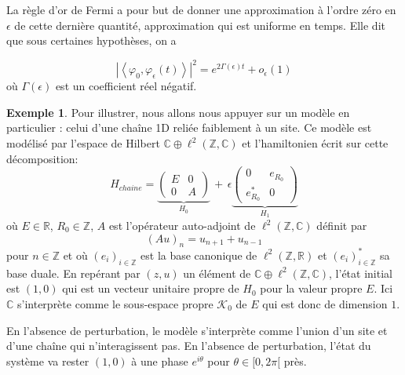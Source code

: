 \documentclass[12pt,openany,a4paper, titlepage]{article}
\newcommand{\lp}{\left(}
\newcommand{\rp}{\right)}
\newcommand{\la}{\left\langle}
\newcommand{\ra}{\right\rangle}
\newcommand{\R}{\mathbb{R}}
\newcommand{\C}{\mathbb{C}}
\newcommand{\Z}{\mathbb{Z}}
\newcommand{\vp}{\varphi}
\theoremstyle{definition}
\theoremstyle{definition}
\theoremstyle{definition}
\newtheorem{ex}{Exemple}
\theoremstyle{definition}
\theoremstyle{definition}
\theoremstyle{definition}
\begin{document}
La règle d'or de Fermi a pour but de donner une approximation à l'ordre zéro en $\epsilon$  de cette dernière quantité, approximation qui est uniforme en temps. Elle dit que sous certaines hypothèses, on a

\begin{equation}
    |\la \vp_0, \vp_\epsilon(t) \ra |^2 = e^{2\Gamma(\epsilon)t} + o_\epsilon(1)
\end{equation}
où $\Gamma(\epsilon)$ est un coefficient réel négatif. 


\begin{ex}
Pour illustrer, nous allons nous appuyer sur un modèle en particulier : celui d'une chaîne 1D reliée faiblement à un site. Ce modèle est modélisé par l'espace de Hilbert $\C\oplus\ell^2(\Z,\C)$ et l'hamiltonien écrit sur cette décomposition:
\begin{equation}
    H_{chaine} = \underbrace{\begin{pmatrix}
E & 0 \\
0 & A 
\end{pmatrix}}_{H_0} \,+\, \epsilon
\underbrace{\begin{pmatrix}
0        & e_{R_0} \\
e_{R_0}^* &  0
\end{pmatrix}}_{H_1}
\end{equation}
où $E\in\R$, $R_0\in\Z$, $A$ est l'opérateur auto-adjoint de $\ell^2(\Z,\C)$ définit par 
\begin{equation}
    (Au)_n = u_{n+1} + u_{n-1}
\end{equation}
pour $n\in\Z$ et où $\lp e_i\rp_{i\in\Z}$ est la base canonique de $\ell^2(\Z,\R)$ et $\lp e_i\rp_{i\in\Z}^*$ sa base duale. En repérant par $(z,u)$ un élément de $\C\oplus\ell^2(\Z,\C)$, l'état initial est $(1,0)$ qui est un vecteur unitaire propre de $H_0$ pour la valeur propre $E$. Ici $\C$ s'interprète comme le sous-espace propre $\mathcal{K}_0$ de $E$ qui est donc de dimension $1$.

En l'absence de perturbation, le modèle s'interprète comme l'union d'un site et d'une chaîne qui n'interagissent pas. En l'absence de perturbation, l'état du système va rester $(1,0)$ à une phase $e^{i\theta}$ pour $\theta\in[0,2\pi[$ près. 


\end{ex}
\end{document}

